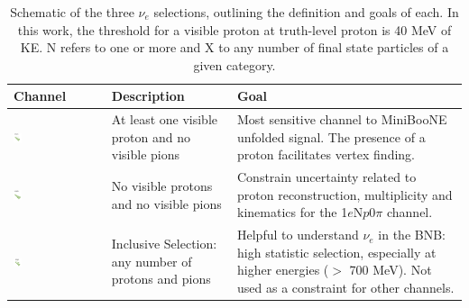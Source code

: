 \documentclass[a4paper]{article}
\begin{document}


\begin{table}[ht]
\caption{\label{tab:selectionsNue} Schematic of the three $\nu_e$ selections, outlining the definition and goals of each. In this work, the threshold for a visible proton at truth-level proton is 40 MeV of KE. N refers to one or more and X to any number of final state particles of a given category.}
\centering
\begin{tabular}{ m{} | m{}  m{}  }
Channel & Description & Goal \\
\hline
 \begin{center}\includegraphics[width=0.1\textwidth]{introduction/1eNp}\end{center}& At least one visible proton and no visible pions & Most sensitive channel to MiniBooNE unfolded signal. The presence of a proton facilitates vertex finding.\\
\hline
 \begin{center}\includegraphics[width=0.1\textwidth]{introduction/1e0p}\end{center}& No visible protons and no visible pions & Constrain uncertainty related to proton reconstruction, multiplicity and kinematics for the 1$e$N$p$0$\pi$ channel.\\
\hline
\begin{center}\includegraphics[width=0.1\textwidth]{introduction/inclusive} \end{center} & Inclusive Selection: any number of protons and pions & Helpful to understand $\nu_e$ in the BNB: high statistic selection, especially at higher energies ($>$ 700 MeV). Not used as a constraint for other channels. \\
\hline
\end{tabular}
\label{tab:gt}
\end{table}
\end{document}
